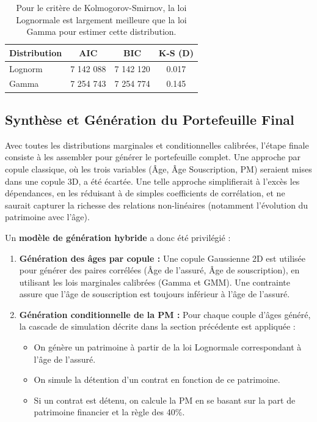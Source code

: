 \begin{table}[H]
\centering
\begin{tabular}{@{}lccc@{}}
\toprule
\textbf{Distribution} & \textbf{AIC} & \textbf{BIC} & \textbf{K-S (D)} \\
\midrule
Lognorm & 7 142 088 & 7 142 120 & 0.017 \\
Gamma & 7 254 743 & 7 254 774 & 0.145 \\
\bottomrule
\end{tabular}
\caption{Pour le critère de Kolmogorov-Smirnov, la loi Lognormale est largement meilleure que la loi Gamma pour estimer cette distribution.}
\label{tab:stats_pm}
\end{table}


\subsection{Synthèse et Génération du Portefeuille Final}

Avec toutes les distributions marginales et conditionnelles calibrées, l'étape finale consiste à les assembler pour générer le portefeuille complet. Une approche par copule classique, où les trois variables (Âge, Âge Souscription, PM) seraient mises dans une copule 3D, a été écartée. Une telle approche simplifierait à l'excès les dépendances, en les réduisant à de simples coefficients de corrélation, et ne saurait capturer la richesse des relations non-linéaires (notamment l'évolution du patrimoine avec l'âge).

Un \textbf{modèle de génération hybride} a donc été privilégié :

\begin{enumerate}
    \item \textbf{Génération des âges par copule :} Une copule Gaussienne 2D est utilisée pour générer des paires corrélées (Âge de l'assuré, Âge de souscription), en utilisant les lois marginales calibrées (Gamma et GMM). Une contrainte assure que l'âge de souscription est toujours inférieur à l'âge de l'assuré.
    
    \item \textbf{Génération conditionnelle de la PM :} Pour chaque couple d'âges généré, la cascade de simulation décrite dans la section précédente est appliquée :
    \begin{itemize}
        \item On génère un patrimoine à partir de la loi Lognormale correspondant à l'âge de l'assuré.
        \item On simule la détention d'un contrat en fonction de ce patrimoine.
        \item Si un contrat est détenu, on calcule la PM en se basant sur la part de patrimoine financier et la règle des 40\%.
    \end{itemize}
\end{enumerate}

